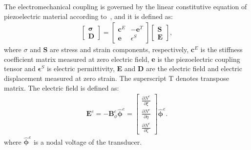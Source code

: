 \documentclass[sensors,article,submit,moreauthors,pdftex]{Definitions/mdpi}
\begin{document}
The electromechanical coupling is governed by the linear constitutive equation of piezoelectric material according to~\cite{giurgiutiumicromechatronics, rekatsinas2017cubic}, and it is defined as:
\begin{eqnarray}
\left [ 
\begin {array}{c}
\boldsymbol{\sigma}\\
\textbf{D}
\end{array}\right ]=
\left [ 
\begin{array}{cc}
\textbf{c}^E & -\textbf{e}^T \\
\textbf{e} & \epsilon^S 
\end{array} \right ]
\left[ 
\begin{array}{c}
\textbf{S}\\
\textbf{E} 
\end{array} \right ],
\end{eqnarray}
where \(\sigma\) and \(\textbf{S}\) are stress and strain components, respectively, \(\textbf{c}^E\) is the stiffness coefficient matrix measured at zero electric field, \textbf{e} is the piezoelectric coupling tensor and \(\boldsymbol{\epsilon}^S\) is electric permittivity, \textbf{E} and \textbf{D} are the electric field and electric displacement measured at zero strain.
The superscript T denotes transpose matrix.
The electric field is defined as:
\begin{eqnarray}
\textbf{E}^e=-\textbf{B}_\phi^e \widehat{\boldsymbol{\phi}}^e = \left[ \begin{array}{c}
\frac{\partial N^e}{\partial \xi}\\
\frac{\partial N^e}{\partial \eta}\\
\frac{\partial N^e}{\partial \zeta}
\end{array} \right] \widehat{\boldsymbol{\phi}}^e.
\end{eqnarray}
where \(\widehat{\boldsymbol{\phi}}^e\) is a nodal voltage of the transducer.
\end{document}
